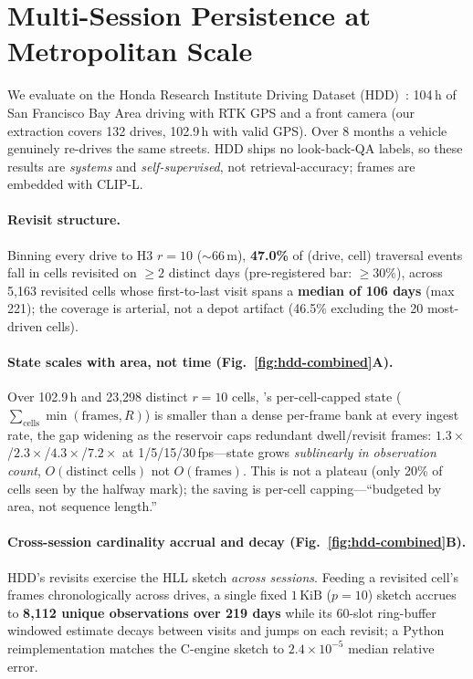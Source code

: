 
\section{Multi-Session Persistence at Metropolitan Scale}
\label{sec:results-hdd}

We evaluate on the Honda Research Institute Driving Dataset
(HDD)~\cite{ramanishka2018hdd}: 104\,h of San Francisco Bay Area driving
with RTK GPS and a front camera (our extraction covers 132 drives,
102.9\,h with valid GPS). Over 8 months a vehicle genuinely re-drives the
same streets. HDD ships no look-back-QA labels, so these results are
\emph{systems} and \emph{self-supervised}, not retrieval-accuracy; frames
are embedded with CLIP-L.

\paragraph{Revisit structure.}
Binning every drive to H3 $r{=}10$ (${\sim}66$\,m), \textbf{47.0\%} of
(drive, cell) traversal events fall in cells revisited on $\geq2$ distinct
days (pre-registered bar: $\geq30\%$), across 5{,}163 revisited cells
whose first-to-last visit spans a \textbf{median of 106 days} (max 221);
the coverage is arterial, not a depot artifact (46.5\% excluding the 20
most-driven cells).

\paragraph{State scales with area, not time (Fig.~\ref{fig:hdd-combined}A).}
Over 102.9\,h and 23{,}298 distinct $r{=}10$ cells, \psm{}'s
per-cell-capped state ($\sum_\text{cells}\min(\text{frames}, R)$) is
smaller than a dense per-frame bank at every ingest rate, the gap widening
as the reservoir caps redundant dwell/revisit frames:
$1.3\times$/$2.3\times$/$4.3\times$/$7.2\times$ at 1/5/15/30\,fps---state
grows \emph{sublinearly in observation count}, $O(\text{distinct cells})$
not $O(\text{frames})$. This is not a plateau (only 20\% of cells seen by
the halfway mark); the saving is per-cell capping---``budgeted by area,
not sequence length.''

\paragraph{Cross-session cardinality accrual and decay
(Fig.~\ref{fig:hdd-combined}B).}
HDD's revisits exercise the HLL sketch \emph{across sessions}. Feeding a
revisited cell's frames chronologically across drives, a single fixed
$1\,\mathrm{KiB}$ ($p{=}10$) sketch accrues to \textbf{8{,}112 unique
observations over 219 days} while its 60-slot ring-buffer windowed estimate
decays between visits and jumps on each revisit; a Python reimplementation
matches the C-engine sketch to $2.4\times10^{-5}$ median relative error.

